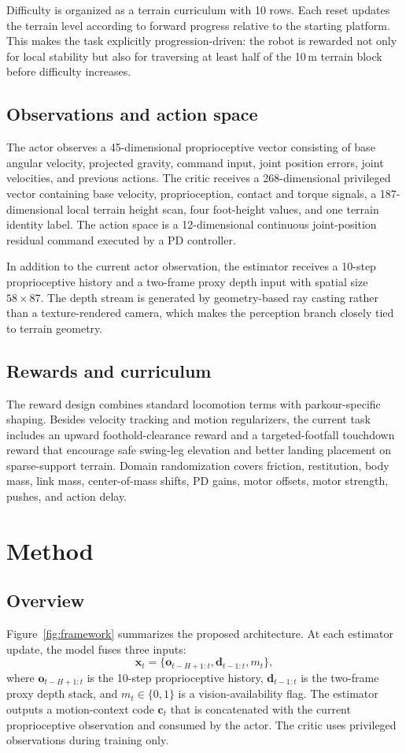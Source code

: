 \documentclass[letterpaper,10pt,conference]{ieeeconf}
\begin{document}
Difficulty is organized as a terrain curriculum with 10 rows. Each reset updates the terrain level according to forward progress relative to the starting platform. This makes the task explicitly progression-driven: the robot is rewarded not only for local stability but also for traversing at least half of the 10\,m terrain block before difficulty increases.

\subsection{Observations and action space}
The actor observes a 45-dimensional proprioceptive vector consisting of base angular velocity, projected gravity, command input, joint position errors, joint velocities, and previous actions. The critic receives a 268-dimensional privileged vector containing base velocity, proprioception, contact and torque signals, a 187-dimensional local terrain height scan, four foot-height values, and one terrain identity label. The action space is a 12-dimensional continuous joint-position residual command executed by a PD controller.

In addition to the current actor observation, the estimator receives a 10-step proprioceptive history and a two-frame proxy depth input with spatial size $58 \times 87$. The depth stream is generated by geometry-based ray casting rather than a texture-rendered camera, which makes the perception branch closely tied to terrain geometry.

\subsection{Rewards and curriculum}
The reward design combines standard locomotion terms with parkour-specific shaping. Besides velocity tracking and motion regularizers, the current task includes an upward foothold-clearance reward and a targeted-footfall touchdown reward that encourage safe swing-leg elevation and better landing placement on sparse-support terrain. Domain randomization covers friction, restitution, body mass, link mass, center-of-mass shifts, PD gains, motor offsets, motor strength, pushes, and action delay.

\section{Method}
\subsection{Overview}
Figure~\ref{fig:framework} summarizes the proposed architecture. At each estimator update, the model fuses three inputs:
\begin{equation}
\mathbf{x}_t = \{\mathbf{o}_{t-H+1:t}, \mathbf{d}_{t-1:t}, m_t\},
\end{equation}
where $\mathbf{o}_{t-H+1:t}$ is the 10-step proprioceptive history, $\mathbf{d}_{t-1:t}$ is the two-frame proxy depth stack, and $m_t \in \{0,1\}$ is a vision-availability flag. The estimator outputs a motion-context code $\mathbf{c}_t$ that is concatenated with the current proprioceptive observation and consumed by the actor. The critic uses privileged observations during training only.
\end{document}
